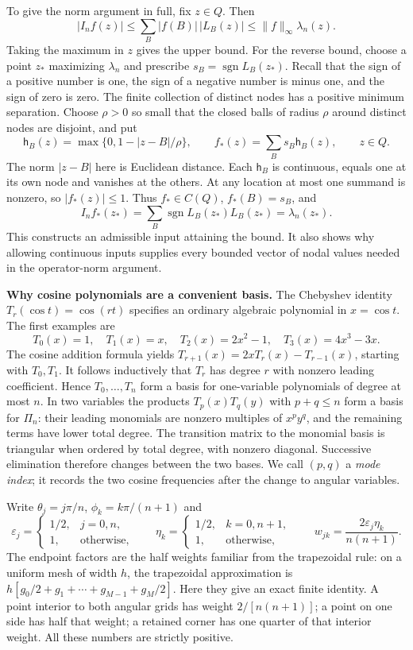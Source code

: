To give the norm argument in full, fix $z\in Q$. Then
\[
 |I_nf(z)|\leq\sum_B|f(B)|\,|L_B(z)|
       \leq\|f\|_\infty\lambda_n(z).
\]
Taking the maximum in $z$ gives the upper bound. For the reverse bound,
choose a point $z_*$ maximizing $\lambda_n$ and prescribe
$s_B=\operatorname{sgn}L_B(z_*)$. Recall that the sign of a positive
number is one, the sign of a negative number is minus one, and the sign
of zero is zero. The finite collection of distinct nodes has a positive minimum
separation. Choose $\rho>0$ so small that the closed balls of radius
$\rho$ around distinct nodes are disjoint, and put
\[
 \mathsf{h}_B(z)=\max\{0,1-|z-B|/\rho\},\qquad
 f_*(z)=\sum_B s_B\mathsf{h}_B(z),\qquad z\in Q.
\]
The norm $|z-B|$ here is Euclidean distance. Each $\mathsf{h}_B$ is continuous,
equals one at its own node and vanishes at the others. At any location
at most one summand is nonzero, so $|f_*(z)|\leq1$. Thus $f_*\in C(Q)$,
$f_*(B)=s_B$, and
\[
 I_nf_*(z_*)=\sum_B\operatorname{sgn}L_B(z_*)L_B(z_*)
              =\lambda_n(z_*).
\]
This constructs an admissible input attaining the bound. It also shows
why allowing continuous inputs supplies every bounded vector of nodal
values needed in the operator-norm argument.

\noindent\textbf{Why cosine polynomials are a convenient basis.}
The Chebyshev identity $T_r(\cos t)=\cos(rt)$ specifies an ordinary algebraic polynomial
in $x=\cos t$. The first examples are
\[
 T_0(x)=1,\quad T_1(x)=x,\quad T_2(x)=2x^2-1,
 \quad T_3(x)=4x^3-3x.
\]
The cosine addition formula yields
$T_{r+1}(x)=2xT_r(x)-T_{r-1}(x)$, starting with $T_0,T_1$.
It follows inductively that $T_r$ has degree $r$ with nonzero leading
coefficient. Hence $T_0,\ldots,T_n$ form a basis for one-variable
polynomials of degree at most $n$. In two variables the products
$T_p(x)T_q(y)$ with $p+q\leq n$ form a basis for $\Pi_n$:
their leading monomials are nonzero multiples of $x^py^q$, and the
remaining terms have lower total degree. The transition matrix to the monomial basis is triangular when ordered
by total degree, with nonzero diagonal. Successive elimination therefore
changes between the two bases.
We call $(p,q)$ a \emph{mode index}; it records the two cosine
frequencies after the change to angular variables.

Write
$\theta_j=j\pi/n$, $\phi_k=k\pi/(n+1)$ and
\[
 \varepsilon_j=\begin{cases}1/2,&j=0,n,\\1,&\text{otherwise},\end{cases}
 \qquad
 \eta_k=\begin{cases}1/2,&k=0,n+1,\\1,&\text{otherwise},\end{cases}
 \qquad w_{jk}=\frac{2\varepsilon_j\eta_k}{n(n+1)}.
\]
The endpoint factors are the half weights familiar from the trapezoidal
rule: on a uniform mesh of width $h$, the trapezoidal approximation is
$h[g_0/2+g_1+\cdots+g_{M-1}+g_M/2]$. Here they give an exact finite identity. A point interior to both angular grids has
weight $2/[n(n+1)]$; a point on one side has half that weight; a retained
corner has one quarter of that interior weight. All these numbers are
strictly positive.

